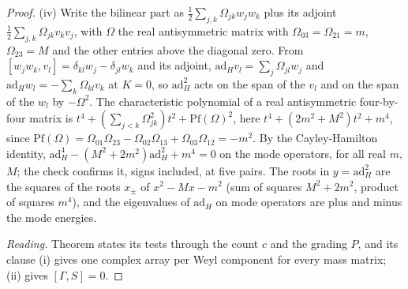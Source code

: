 \begin{proof}
(iv) Write the bilinear part as $\tfrac12\sum_{j,k}\Omega_{jk}w_{j}w_{k}$ plus its adjoint $\tfrac12\sum_{j,k}\Omega_{jk}v_{k}v_{j}$, with $\Omega$ the real antisymmetric matrix with $\Omega_{03} = \Omega_{21} = m$, $\Omega_{23} = M$ and the other entries above the diagonal zero. From $[w_{j}w_{k}, v_{l}] = \delta_{kl}w_{j} - \delta_{jl}w_{k}$ and its adjoint, $\mathrm{ad}_{H}v_{l} = \sum_{j}\Omega_{jl}w_{j}$ and $\mathrm{ad}_{H}w_{l} = -\sum_{k}\Omega_{kl}v_{k}$ at $K = 0$, so $\mathrm{ad}_{H}^{2}$ acts on the span of the $v_{l}$ and on the span of the $w_{l}$ by $-\Omega^{2}$. The characteristic polynomial of a real antisymmetric four-by-four matrix is $t^{4} + (\sum_{j<k}\Omega_{jk}^{2})t^{2} + \mathrm{Pf}(\Omega)^{2}$, here $t^{4} + (2m^{2} + M^{2})t^{2} + m^{4}$, since $\mathrm{Pf}(\Omega) = \Omega_{01}\Omega_{23} - \Omega_{02}\Omega_{13} + \Omega_{03}\Omega_{12} = -m^{2}$. By the Cayley-Hamilton identity, $\mathrm{ad}_{H}^{4} - (M^{2} + 2m^{2})\mathrm{ad}_{H}^{2} + m^{4} = 0$ on the mode operators, for all real $m$, $M$; the check confirms it, signs included, at five pairs. The roots in $y = \mathrm{ad}_{H}^{2}$ are the squares of the roots $x_{\pm}$ of $x^{2} - Mx - m^{2}$ (sum of squares $M^{2} + 2m^{2}$, product of squares $m^{4}$), and the eigenvalues of $\mathrm{ad}_{H}$ on mode operators are plus and minus the mode energies.

\emph{Reading.} Theorem  states its tests through the count $c$ and the grading $P$, and its clause (i) gives one complex array per Weyl component for every mass matrix; (ii) gives $[\Gamma, S] = 0$.
\end{proof}
